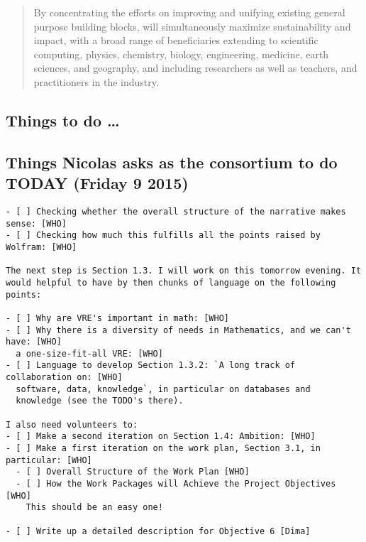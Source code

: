 \documentclass[noworkareas,deliverables,\classoptions]{euproposal}       %
\begin{document}
\begin{proposal}
\begin{abstract}
  By concentrating the efforts on improving and unifying existing
  general purpose building blocks, \TheProject will simultaneously
  maximize sustainability and impact, with a broad range of
  beneficiaries extending to scientific computing, physics, chemistry,
  biology, engineering, medicine, earth sciences, and geography, and
  including researchers as well as teachers, and practitioners in the
  industry.
\end{abstract}
\tableofcontents



\begin{draft}
\section*{Things to do \dots}
\subsection*{Things Nicolas asks as the consortium to do TODAY (Friday 9 2015)}
\begin{verbatim}
- [ ] Checking whether the overall structure of the narrative makes sense: [WHO]
- [ ] Checking how much this fulfills all the points raised by Wolfram: [WHO]

The next step is Section 1.3. I will work on this tomorrow evening. It
would helpful to have by then chunks of language on the following points:

- [ ] Why are VRE's important in math: [WHO]
- [ ] Why there is a diversity of needs in Mathematics, and we can't have: [WHO]
  a one-size-fit-all VRE: [WHO]
- [ ] Language to develop Section 1.3.2: `A long track of collaboration on: [WHO]
  software, data, knowledge`, in particular on databases and
  knowledge (see the TODO's there).

I also need volunteers to:
- [ ] Make a second iteration on Section 1.4: Ambition: [WHO]
- [ ] Make a first iteration on the work plan, Section 3.1, in particular: [WHO]
  - [ ] Overall Structure of the Work Plan [WHO]
  - [ ] How the Work Packages will Achieve the Project Objectives [WHO]
    This should be an easy one!

- [ ] Write up a detailed description for Objective 6 [Dima]
\end{verbatim}

\end{draft}
\begin{draft}


\end{draft}
\end{proposal}
\end{document}
